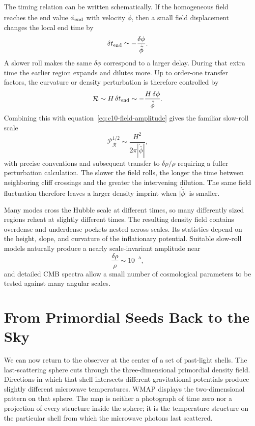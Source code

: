 The timing relation can be written schematically. If the homogeneous field reaches the end value \(\phi_{\rm end}\) with velocity \(\dot{\bar\phi}\), then a small field displacement changes the local end time by
\begin{equation}
\delta t_{\rm end}
\simeq-\frac{\delta\phi}{\dot{\bar\phi}}.
\label{eq:c10-time-delay}
\end{equation}
A slower roll makes the same \(\delta\phi\) correspond to a larger delay. During that extra time the earlier region expands and dilutes more. Up to order-one transfer factors, the curvature or density perturbation is therefore controlled by
\begin{equation}
\mathcal R
\sim H\,\delta t_{\rm end}
\sim-\frac{H\,\delta\phi}{\dot{\bar\phi}}.
\label{eq:c10-curvature-estimate}
\end{equation}
Combining this with equation~\eqref{eq:c10-field-amplitude} gives the familiar slow-roll scale
\begin{equation}
\mathcal P_{\mathcal R}^{1/2}
\sim\frac{H^2}{2\pi|\dot{\bar\phi}|},
\label{eq:c10-slow-roll-amplitude}
\end{equation}
with precise conventions and subsequent transfer to \(\delta\rho/\rho\) requiring a fuller perturbation calculation. The slower the field rolls, the longer the time between neighboring cliff crossings and the greater the intervening dilution. The same field fluctuation therefore leaves a larger density imprint when \(\lvert\dot{\bar\phi}\rvert\) is smaller.

Many modes cross the Hubble scale at different times, so many differently sized regions reheat at slightly different times. The resulting density field contains overdense and underdense pockets nested across scales. Its statistics depend on the height, slope, and curvature of the inflationary potential. Suitable slow-roll models naturally produce a nearly scale-invariant amplitude near
\[
\frac{\delta\rho}{\rho}\sim10^{-5},
\]
and detailed CMB spectra allow a small number of cosmological parameters to be tested against many angular scales.

\section{From Primordial Seeds Back to the Sky}

We can now return to the observer at the center of a set of past-light shells. The last-scattering sphere cuts through the three-dimensional primordial density field. Directions in which that shell intersects different gravitational potentials produce slightly different microwave temperatures. WMAP displays the two-dimensional pattern on that sphere. The map is neither a photograph of time zero nor a projection of every structure inside the sphere; it is the temperature structure on the particular shell from which the microwave photons last scattered.

